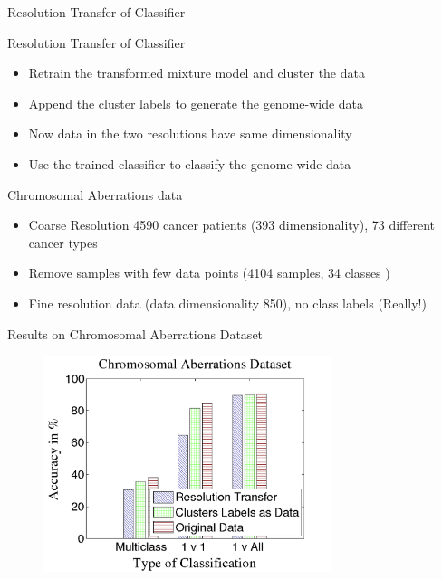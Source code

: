 \documentclass[utf8, a4paper]{beamer}
\begin{document}
\begin{frame}
  {Resolution Transfer of Classifier}

  \vspace{0cm}
  \begin{alertblock}
    {Resolution Transfer of Classifier}

    \begin{itemize}
    \itemsep 0em 
    \item Retrain the transformed mixture model and cluster the data 
    \item Append the cluster labels to generate the genome-wide data
    \item Now data in the two resolutions have same dimensionality
    \item Use the trained classifier to classify the genome-wide data
    \end{itemize}
  \end{alertblock}
  
    \begin{alertblock}
    {Chromosomal Aberrations data}

    \begin{itemize}
    \itemsep 0em 
    \item Coarse Resolution 4590 cancer patients (393 dimensionality), 73 different cancer types 
    \item Remove samples with few data points (4104 samples, 34 classes )
    \item Fine resolution data (data dimensionality 850), no class labels (Really!)
   
    \end{itemize}
  \end{alertblock}
  
\end{frame}



\begin{frame}
  {Results on Chromosomal Aberrations Dataset}
  \vspace{-1cm}
\begin{figure}
\centering
  \includegraphics[trim={0cm 0cm 0cm 0cm},clip, width=0.75\textwidth]{images/barlkhood}
\end{figure} 
\end{frame}
\end{document}

